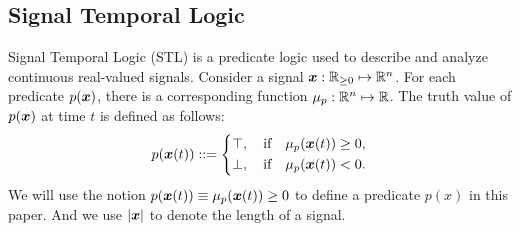     \subsection{Signal Temporal Logic}
    \label{sec:Signal Temporal Logic}
    Signal Temporal Logic (STL) \cite{maler2004monitoring} is a predicate logic used to describe and analyze continuous real-valued signals. Consider a signal $\bm{x}:\mathbb{R}_{\ge 0}\mapsto \mathbb{R}^n$. For each predicate $p(\bm{x})$, there is a corresponding function %
    $\mu_p:\mathbb{R}^n\mapsto \mathbb{R}$. The truth value of $p(\bm{x})$ at time $t$ is defined as follows:
    \begin{align*}
        p(\bm{x}(t)) \mathrel{::=}\left\{
            \begin{aligned}
                \top,\quad \text{if}\quad \mu_p(\bm{x}(t)) \ge 0,\\
                \bot,\quad \text{if}\quad \mu_p(\bm{x}(t)) < 0.
            \end{aligned}\right.
    \end{align*}
    We will use the notion $p(\bm{x}(t))\equiv\mu_p(\bm{x}(t))\ge 0$ to define a predicate $p(x)$ in this paper. And we use \(|\bm{x}|\) to denote the length of a signal.
    

